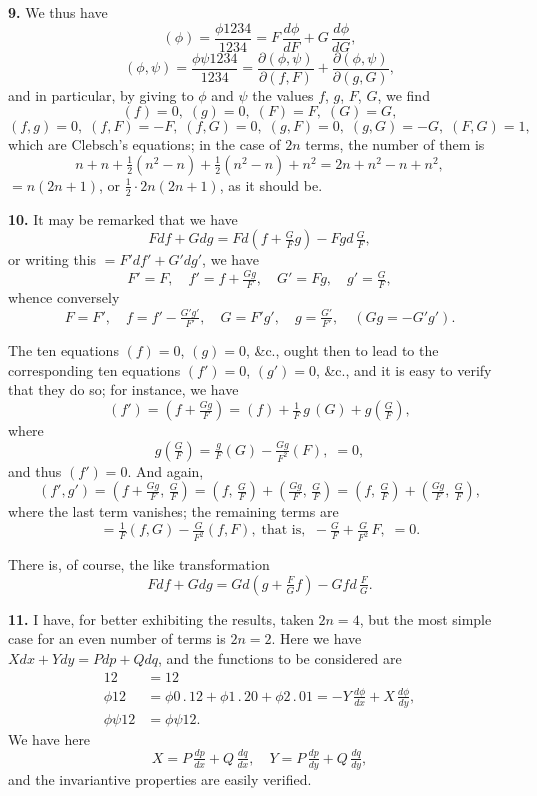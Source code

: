 \documentclass[11pt]{article}
\begin{document}
\medskip
\textbf{9.} We thus have
\[ (\phi) = \frac{\phi 1234}{1234} = F\,\frac{d\phi}{dF} + G\,\frac{d\phi}{dG}, \]
\[ (\phi,\psi) = \frac{\phi\psi 1234}{1234} = \frac{\partial(\phi,\psi)}{\partial(f,F)} + \frac{\partial(\phi,\psi)}{\partial(g,G)}, \]
and in particular, by giving to $\phi$ and $\psi$ the values $f$, $g$, $F$, $G$, we find
\[ (f) = 0,\;(g) = 0,\;(F) = F,\;(G) = G, \]
\[ (f,g) = 0,\;(f,F) = -F,\;(f,G) = 0,\;(g,F) = 0,\;(g,G) = -G,\;(F,G) = 1, \]
which are Clebsch's equations; in the case of $2n$ terms, the number of them is
\[ n + n + \tfrac{1}{2}(n^{2}-n) + \tfrac{1}{2}(n^{2}-n) + n^{2} = 2n + n^{2} - n + n^{2}, \]
$=n(2n+1)$, or $\tfrac{1}{2}\cdot 2n(2n+1)$, as it should be.

\medskip
\textbf{10.} It may be remarked that we have
\[ Fdf + Gdg = Fd\!\left(f + \tfrac{G}{F}g\right) - Fgd\,\tfrac{G}{F}, \]
or writing this $= F'df' + G'dg'$, we have
\[ F' = F,\quad f' = f + \tfrac{Gg}{F},\quad G' = Fg,\quad g' = \tfrac{G}{F}, \]
whence conversely
\[ F = F',\quad f = f' - \tfrac{G'g'}{F'},\quad G = F'g',\quad g = \tfrac{G'}{F'},\quad (Gg = -G'g'). \]

The ten equations $(f) = 0$, $(g) = 0$, \&c., ought then to lead to the corresponding ten equations $(f') = 0$, $(g') = 0$, \&c., and it is easy to verify that they do so; for instance, we have
\[ (f') = \left(f + \tfrac{Gg}{F}\right) = (f) + \tfrac{1}{F}\,g\,(G) + g\left(\tfrac{G}{F}\right), \]
where
\[ g\left(\tfrac{G}{F}\right) = \tfrac{g}{F}(G) - \tfrac{Gg}{F^{2}}(F),\;= 0, \]
and thus $(f') = 0$. And again,
\[ (f',g') = \left(f + \tfrac{Gg}{F},\,\tfrac{G}{F}\right) = \left(f,\,\tfrac{G}{F}\right) + \left(\tfrac{Gg}{F},\,\tfrac{G}{F}\right) = \left(f,\,\tfrac{G}{F}\right) + \left(\tfrac{Gg}{F},\,\tfrac{G}{F}\right), \]
where the last term vanishes; the remaining terms are
\[ = \tfrac{1}{F}(f,G) - \tfrac{G}{F^{2}}(f,F),\;\text{that is,}\;\;-\tfrac{G}{F} + \tfrac{G}{F^{2}}\,F,\;= 0. \]

There is, of course, the like transformation
\[ Fdf + Gdg = Gd\!\left(g + \tfrac{F}{G}f\right) - Gfd\,\tfrac{F}{G}. \]

\medskip
\textbf{11.} I have, for better exhibiting the results, taken $2n=4$, but the most simple case for an even number of terms is $2n=2$. Here we have $Xdx + Ydy = Pdp + Qdq$, and the functions to be considered are
\begin{align*}
12 &= 12\\
\phi 12 &= \phi 0\,.\,12 + \phi 1\,.\,20 + \phi 2\,.\,01 = -Y\,\tfrac{d\phi}{dx} + X\,\tfrac{d\phi}{dy},\\
\phi\psi 12 &= \phi\psi 12.
\end{align*}
We have here
\[ X = P\,\tfrac{dp}{dx} + Q\,\tfrac{dq}{dx},\quad Y = P\,\tfrac{dp}{dy} + Q\,\tfrac{dq}{dy}, \]
and the invariantive properties are easily verified.
\end{document}
